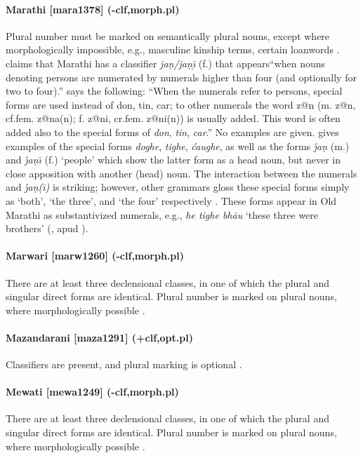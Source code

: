 \paragraph{Marathi [mara1378] (-clf,morph.pl)}
Plural number must be marked on semantically plural nouns, except where morphologically impossible, e.g., masculine kinship terms, certain loanwords \citep[366--7]{Pandharipande1997}. \citet[11]{Emeneau1956} claims that Marathi has a classifier {\it ja\d{n}/ja\d{n}\d{\={\i}}} (f.) that appears``when nouns denoting persons are numerated by numerals higher than four (and optionally for two to four).'' \citet[243]{Lambert1943} says the following: ``When the numerals refer to persons, special forms are used instead of don, tin, car; to other numerals the word {\IPA z@\:n} (m. {\IPA z@\:n}, cf.fem. {\IPA z@\:na(n)}; f. {\IPA z@\:ni}, cr.fem. {\IPA z@\:ni(n)}) is usually added. This word is often added also to the special forms of {\it don}, {\it tin}, {\it car}.'' No examples are given. \citet[50]{Katenina1963} gives examples of the special forms {\it doghe}, {\it tighe}, {\it \'caughe}, as well as the forms {\it {\'\j}a\d{n}} (m.) and {\it {\'\j}a\d{n}\={\i}} (f.) `people' which show the latter form as a head noun, but never in close apposition with another (head) noun. The interaction between the numerals and {\it {\'\j}a\d{n}(\={\i})} is striking; however, other grammars gloss these special forms simply as `both', `the three', and `the four' respectively \citep[59]{DhongdeWali2009}. These forms appear in Old Marathi as substantivized numerals, e.g., {\it he tighe bh\=au} `these three were brothers' (\citealt{Tulpule1963}, apud \citealt[425]{Southworth1970}).
\paragraph{Marwari [marw1260] (-clf,morph.pl)}
There are at least three declensional classes, in one of which the plural and singular direct forms are identical. Plural number is marked on plural nouns, where morphologically possible \citep[20, 29]{Gusain2004}.
\paragraph{Mazandarani [maza1291] (+clf,opt.pl)}
Classifiers are present, and plural marking is optional \citep[9--10]{Nawata1984}.
\paragraph{Mewati [mewa1249] (-clf,morph.pl)}
There are at least three declensional classes, in one of which the plural and singular direct forms are identical. Plural number is marked on plural nouns, where morphologically possible \citep[20, 29]{Gusain2003}.
